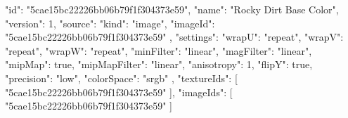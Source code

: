 {
  "id": "5cae15bc22226bb06b79f1f304373e59",
  "name": "Rocky Dirt Base Color",
  "version": 1,
  "source": {
    "kind": "image",
    "imageId": "5cae15bc22226bb06b79f1f304373e59"
  },
  "settings": {
    "wrapU": "repeat",
    "wrapV": "repeat",
    "wrapW": "repeat",
    "minFilter": "linear",
    "magFilter": "linear",
    "mipMap": true,
    "mipMapFilter": "linear",
    "anisotropy": 1,
    "flipY": true,
    "precision": "low",
    "colorSpace": "srgb"
  },
  "textureIds": [
    "5cae15bc22226bb06b79f1f304373e59"
  ],
  "imageIds": [
    "5cae15bc22226bb06b79f1f304373e59"
  ]
}
